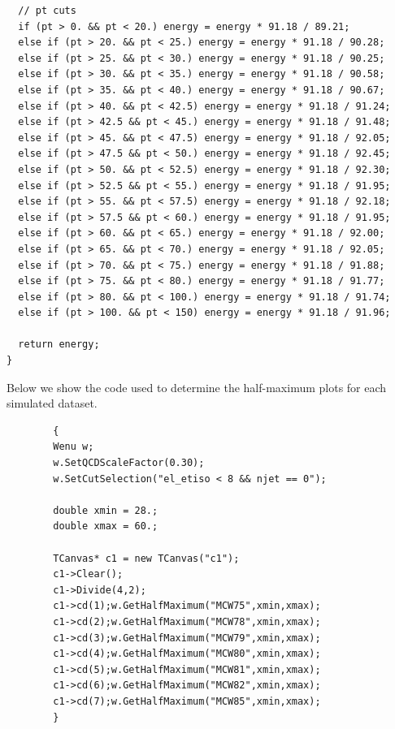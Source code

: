 \documentclass[a4paper]{report}
\numberwithin{equation}{section}
\begin{document}
\begin{tcolorbox}
\begin{verbatim}
  // pt cuts
  if (pt > 0. && pt < 20.) energy = energy * 91.18 / 89.21;
  else if (pt > 20. && pt < 25.) energy = energy * 91.18 / 90.28;
  else if (pt > 25. && pt < 30.) energy = energy * 91.18 / 90.25;
  else if (pt > 30. && pt < 35.) energy = energy * 91.18 / 90.58;
  else if (pt > 35. && pt < 40.) energy = energy * 91.18 / 90.67;
  else if (pt > 40. && pt < 42.5) energy = energy * 91.18 / 91.24;
  else if (pt > 42.5 && pt < 45.) energy = energy * 91.18 / 91.48;
  else if (pt > 45. && pt < 47.5) energy = energy * 91.18 / 92.05;
  else if (pt > 47.5 && pt < 50.) energy = energy * 91.18 / 92.45;
  else if (pt > 50. && pt < 52.5) energy = energy * 91.18 / 92.30;
  else if (pt > 52.5 && pt < 55.) energy = energy * 91.18 / 91.95;
  else if (pt > 55. && pt < 57.5) energy = energy * 91.18 / 92.18;
  else if (pt > 57.5 && pt < 60.) energy = energy * 91.18 / 91.95;
  else if (pt > 60. && pt < 65.) energy = energy * 91.18 / 92.00;
  else if (pt > 65. && pt < 70.) energy = energy * 91.18 / 92.05;
  else if (pt > 70. && pt < 75.) energy = energy * 91.18 / 91.88;
  else if (pt > 75. && pt < 80.) energy = energy * 91.18 / 91.77;
  else if (pt > 80. && pt < 100.) energy = energy * 91.18 / 91.74;
  else if (pt > 100. && pt < 150) energy = energy * 91.18 / 91.96;

  return energy;
} 
\end{verbatim}
\end{tcolorbox}

Below we show the code used to determine the half-maximum plots for each simulated dataset. 

\begin{tcolorbox}
    \begin{verbatim}
        {
        Wenu w;
        w.SetQCDScaleFactor(0.30);
        w.SetCutSelection("el_etiso < 8 && njet == 0");

        double xmin = 28.;
        double xmax = 60.;

        TCanvas* c1 = new TCanvas("c1");
        c1->Clear();
        c1->Divide(4,2);
        c1->cd(1);w.GetHalfMaximum("MCW75",xmin,xmax);
        c1->cd(2);w.GetHalfMaximum("MCW78",xmin,xmax);
        c1->cd(3);w.GetHalfMaximum("MCW79",xmin,xmax);
        c1->cd(4);w.GetHalfMaximum("MCW80",xmin,xmax);
        c1->cd(5);w.GetHalfMaximum("MCW81",xmin,xmax);
        c1->cd(6);w.GetHalfMaximum("MCW82",xmin,xmax);
        c1->cd(7);w.GetHalfMaximum("MCW85",xmin,xmax);
        }
    \end{verbatim}
\end{tcolorbox}
\end{document}
